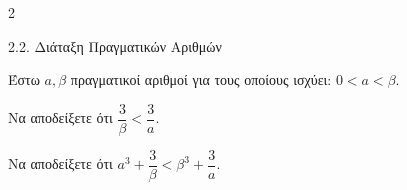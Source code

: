 
\begin{ylh}{2}
    \item 2.2. Διάταξη Πραγματικών Αριθμών
\end{ylh}
Έστω $a, \beta$ πραγματικοί αριθμοί για τους οποίους ισχύει: $0 < a < \beta$.
\begin{alist}
\item Να αποδείξετε ότι $\dfrac{3}{\beta} < \dfrac{3}{a}$.
\item Να αποδείξετε ότι $a^{3} + \dfrac{3}{\beta} < \beta^{3} + \dfrac{3}{a}$.
\end{alist}

